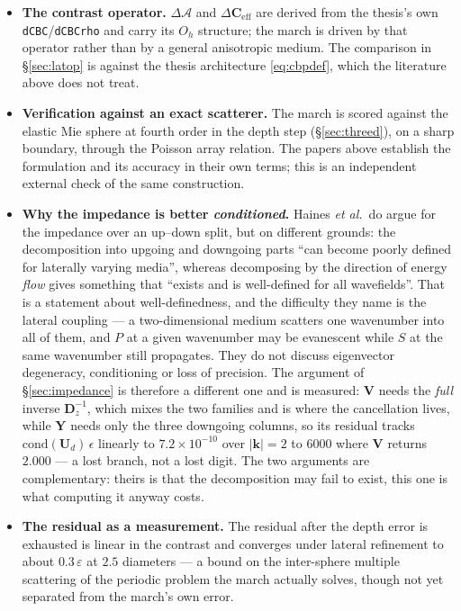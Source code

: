 \documentclass[11pt,a4paper]{article}
\newcommand{\bV}{\mathbf{V}}
\newcommand{\dA}{\Delta\mathcal{A}}
\newcommand{\dCeff}{\Delta\mathbf{C}_{\mathrm{eff}}}
\newcommand{\Oh}{O_{h}}
\newcommand{\bY}{\mathbf{Y}}
\begin{document}
\begin{itemize}
\item \textbf{The contrast operator.}  $\dA$ and $\dCeff$ are derived from the
thesis's own \texttt{dCBC}/\texttt{dCBCrho} and carry its $\Oh$ structure; the
march is driven by that operator rather than by a general anisotropic medium.
The comparison in \S\ref{sec:latop} is against the thesis architecture
\eqref{eq:cbpdef}, which the literature above does not treat.
\item \textbf{Verification against an exact scatterer.}  The march is scored
against the elastic Mie sphere at fourth order in the depth step
(\S\ref{sec:threed}), on a sharp boundary, through the Poisson array relation.
The papers above establish the formulation and its accuracy in their own terms;
this is an independent external check of the same construction.
\item \textbf{Why the impedance is better \emph{conditioned}.}  Haines
\emph{et al.}\ do argue for the impedance over an up--down split, but on
different grounds: the decomposition into upgoing and downgoing parts ``can
become poorly defined for laterally varying media'', whereas decomposing by the
direction of energy \emph{flow} gives something that ``exists and is
well-defined for all wavefields''.  That is a statement about well-definedness,
and the difficulty they name is the lateral coupling --- a two-dimensional
medium scatters one wavenumber into all of them, and $P$ at a given wavenumber
may be evanescent while $S$ at the same wavenumber still propagates.  They do
not discuss eigenvector degeneracy, conditioning or loss of precision.  The
argument of \S\ref{sec:impedance} is therefore a different one and is measured:
$\bV$ needs the \emph{full} inverse $\mathbf{D}_z^{-1}$, which mixes the two
families and is where the cancellation lives, while $\bY$ needs only the three
downgoing columns, so its residual tracks
$\mathrm{cond}(\mathbf{U}_d)\,\epsilon$ linearly to $7.2\times10^{-10}$ over
$|\mathbf{k}|=2$ to $6000$ where $\bV$ returns $2.000$ --- a lost branch, not a
lost digit.  The two arguments are complementary: theirs is that the
decomposition may fail to exist, this one is what computing it anyway costs.
\item \textbf{The residual as a measurement.}  The residual after the depth
error is exhausted is linear in the contrast and converges under lateral
refinement to about $0.3\,\varepsilon$ at $2.5$ diameters --- a bound on the
inter-sphere multiple scattering of the periodic problem the march actually
solves, though not yet separated from the march's own error.
\end{itemize}
\end{document}
